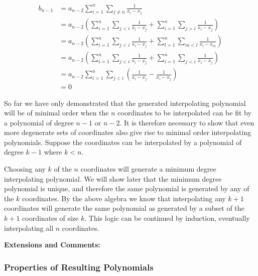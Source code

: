 \begin{subequations}
	\begin{align}
		b_{n-1} &= a_{n-2} \sum_{i=1}^n \sum_{j \ne n} \frac{1}{x_i - x_j}  \\
		&= a_{n-2} \left( \sum_{i=1}^n \sum_{j<i} \frac{1}{x_i - x_j} + \sum_{i=1}^n \sum_{j>i} \frac{1}{x_i - x_j} \right)  \\
		&= a_{n-2} \left( \sum_{i=1}^n \sum_{j<i} \frac{1}{x_i - x_j} + \sum_{l=1}^n \sum_{m<l} \frac{1}{x_l - x_m} \right)\label{eqn:InterpolatingPolynomials_HighestPowerCoefficientIsZeroC}  \\
		&= a_{n-2} \left( \sum_{i=1}^n \sum_{j<i} \frac{1}{x_i - x_j} + \sum_{i=1}^n \sum_{j<i} \frac{1}{x_i - x_j}\right)  \\
		&= a_{n-2} \sum_{i=1}^n \sum_{j<i} \left( \frac{1}{x_i - x_j} - \frac{1}{x_i - x_j}\right)  \\
		&= 0
	\end{align}
	\label{eqn:InterpolatingPolynomials_HighestPowerCoefficientIsZero}
\end{subequations}

So far we have only demonstrated that the generated interpolating polynomial will be of minimal order when the $n$ coordinates to be interpolated can be fit by a polynomial of degree $n - 1$ or $n - 2$. It is therefore necessary to show that even more degenerate sets of coordinates also give rise to minimal order interpolating polynomials. Suppose the coordinates can be interpolated by a polynomial of degree $k - 1$ where $k < n$.

Choosing any $k$ of the $n$ coordinates will generate a minimum degree interpolating polynomial. We will show later that the minimum degree polynomial is unique, and therefore the same polynomial is generated by any of the $k$ coordinates. By the above algebra we know that interpolating any $k + 1$ coordinates will generate the same polynomial as generated by a subset of the $k + 1$ coordinates of size $k$. This logic can be continued by induction, eventually interpolating all $n$ coordinates.

\textbf{Extensions and Comments:}


\subsubsection{Properties of Resulting Polynomials}
















